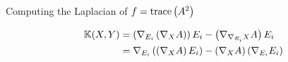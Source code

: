 \begin{frame}[allowframebreaks]{Computing the Laplacian of \(f=\text{trace}\left({A^{2}}\right)\)}
  \framebreak

  \begin{align*}
    \mathbb{K}(X,Y)&=\left(\nabla_{E_{i}}\left(\nabla_{X}A\right)\right)E_{i}-\left(\nabla_{\nabla_{E_{i}}X}A\right)E_{i}              \\
                                                 &=\nabla_{E_{i}}\left(\left(\nabla_{X}A\right)E_{i}\right)-\left(\nabla_{X}A\right)\left(\nabla_{E_{i}}E_{i}\right)
  \end{align*}
\end{frame}
